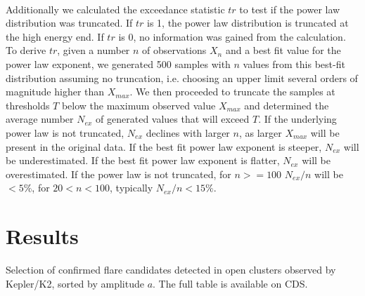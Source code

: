 \documentclass{aa}
\begin{document}
\\
 Additionally we calculated the exceedance statistic $tr$ to test if the power law distribution was truncated. If $tr$ is 1, the power law distribution is truncated at the high energy end. If $tr$ is 0, no information was gained from the calculation. To derive $tr$, given a number $n$ of observations $X_{n}$ and a best fit value for the power law exponent, we generated 500 samples with $n$ values from this best-fit distribution assuming no truncation, i.e. choosing an upper limit several orders of magnitude higher than $X_{max}$. We then proceeded to truncate the samples at thresholds $T$ below the maximum observed value $X_{max}$ and determined the average number $N_{ex}$ of generated values that will exceed $T$. If the underlying power law is not truncated, $N_{ex}$ declines with larger $n$, as larger $X_{max}$ will be present in the original data. If the best fit power law exponent is steeper, $N_{ex}$ will be underestimated. If the best fit power law exponent is flatter, $N_{ex}$ will be overestimated. If the power law is not truncated, for $n>=100$ $N_{ex}/n$ will be $< 5\%$, for $20<n<100$, typically $N_{ex}/n < 15\%$.
\\



\section{Results}

\begin{table}
\caption{Selection of confirmed flare candidates detected in open clusters observed by Kepler/K2, sorted by amplitude $a$. The full table is available on CDS.}\label{flares}
\centering
\footnotesize

\end{table}


\end{document}
